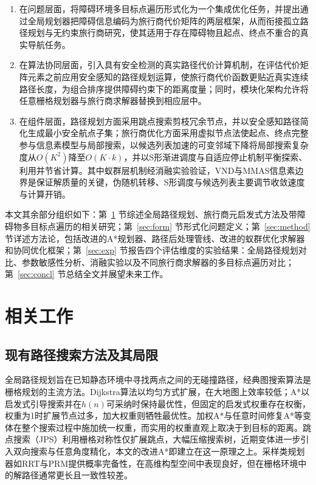 \documentclass[lettersize,journal]{IEEEtran}
\begin{document}
\begin{enumerate}

\item 在问题层面，将障碍环境多目标点遍历形式化为一个集成优化任务，并提出通过全局规划器把障碍信息编码为旅行商代价矩阵的两层框架，从而衔接孤立路径规划与无约束旅行商研究，使其适用于存在障碍物且起点、终点不重合的真实导航任务。

\item 在算法协同层面，引入具有安全检测的真实路径代价计算机制，在评估代价矩阵元素之前应用安全感知的路径规划运算，使旅行商代价函数更贴近真实连续路径长度，为组合排序提供障碍约束下的距离度量；同时，模块化架构允许将任意栅格规划器与旅行商求解器替换到相应层中。

\item 在组件层面，路径规划方面采用跳点搜索剪枝冗余节点，并以安全感知路径简化生成最小安全航点子集；旅行商优化方面采用虚拟节点法使起点、终点完整参与信息素模型与局部搜索，以候选列表加速的可变邻域下降将局部搜索复杂度从$O(K^2)$降至$O(K \cdot k)$，并以S形渐进调度与自适应停止机制平衡探索、利用并节省计算。其中蚁群层机制经消融实验验证，VND与MMAS信息素边界是保证解质量的关键，伪随机转移、S形调度与候选列表主要调节收敛速度与计算开销。

\end{enumerate}

本文其余部分组织如下：第~\textcolor{blue}{\ref{sec:related}} 节综述全局路径规划、旅行商元启发式方法及带障碍物多目标点遍历的相关研究；第~\textcolor{blue}{\ref{sec:form}} 节形式化问题定义；第~\textcolor{blue}{\ref{sec:method}} 节详述方法论，包括改进的A*规划器、路径后处理管线、改进的蚁群优化求解器和协同优化框架；第~\textcolor{blue}{\ref{sec:exp}} 节报告四个评估维度的实验结果：全局路径规划对比、参数敏感性分析、消融实验以及不同旅行商求解器的多目标点遍历对比；第~\textcolor{blue}{\ref{sec:concl}} 节总结全文并展望未来工作。

\section{相关工作}

\label{sec:related}

\subsection{现有路径搜索方法及其局限}

全局路径规划旨在已知静态环境中寻找两点之间的无碰撞路径，经典图搜索算法是栅格规划的主流方法。Dijkstra算法以均匀方式扩展，在大地图上效率较低\textcolor{blue}{\cite{ref6}}；A*以启发式引导搜索并在$h(n)$可采纳时保持最优性\textcolor{blue}{\cite{ref5}}，但固定的启发式权重存在权衡，权重为1时扩展节点过多，加大权重则牺牲最优性\textcolor{blue}{\cite{ref8}}。加权A*与任意时间修复A*等变体在整个搜索过程中施加统一权重\textcolor{blue}{\cite{ref9,ref10}}，而实用的权重直观上取决于到目标的距离。跳点搜索（JPS）利用栅格对称性仅扩展跳点，大幅压缩搜索树\textcolor{blue}{\cite{ref11,ref12}}，近期变体进一步引入双向搜索与任意角度精化\textcolor{blue}{\cite{ref13,ref14,ref15}}，本文的改进A*即建立在这一原理之上。采样类规划器如RRT\textcolor{blue}{\cite{ref7}}与PRM提供概率完备性，在高维构型空间中表现良好，但在栅格环境中的解路径通常更长且一致性较差。
\end{document}
